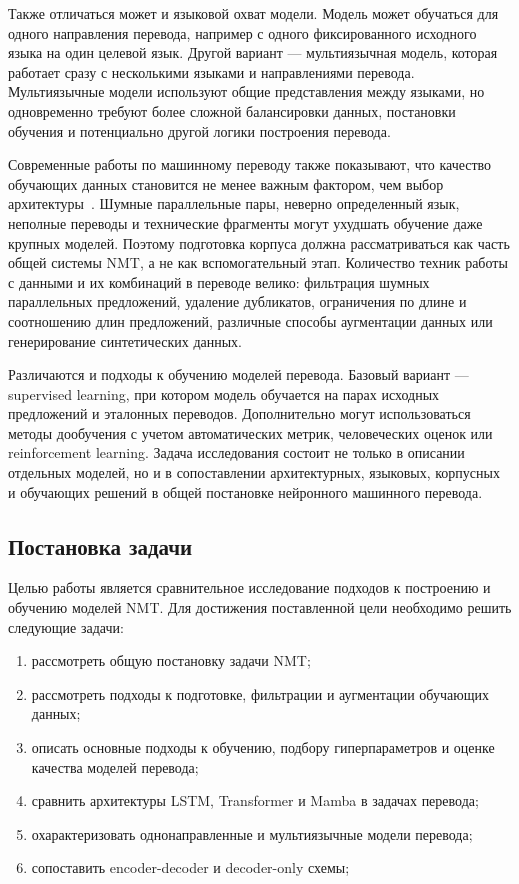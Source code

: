 Также отличаться может и языковой охват модели.
Модель может обучаться для одного направления перевода, например с одного фиксированного исходного языка на один целевой язык.
Другой вариант --- мультиязычная модель, которая работает сразу с несколькими языками и направлениями перевода.
Мультиязычные модели используют общие представления между языками, но одновременно требуют более сложной балансировки данных, постановки обучения и потенциально другой логики построения перевода.

Современные работы по машинному переводу также показывают, что качество обучающих данных становится не менее важным фактором, чем выбор архитектуры~\cite{newspalm_data}.
Шумные параллельные пары, неверно определенный язык, неполные переводы и технические фрагменты могут ухудшать обучение даже крупных моделей.
Поэтому подготовка корпуса должна рассматриваться как часть общей системы NMT, а не как вспомогательный этап.
Количество техник работы с данными и их комбинаций в переводе велико: фильтрация шумных параллельных предложений, удаление дубликатов, ограничения по длине и соотношению длин предложений, различные способы аугментации данных или генерирование синтетических данных.

Различаются и подходы к обучению моделей перевода.
Базовый вариант --- supervised learning, при котором модель обучается на парах исходных предложений и эталонных переводов.
Дополнительно могут использоваться методы дообучения с учетом автоматических метрик, человеческих оценок или reinforcement learning.
Задача исследования состоит не только в описании отдельных моделей, но и в сопоставлении архитектурных, языковых, корпусных и обучающих решений в общей постановке нейронного машинного перевода.

\subsection*{Постановка задачи}
Целью работы является сравнительное исследование подходов к построению и обучению моделей NMT.
Для достижения поставленной цели необходимо решить следующие задачи:
\begin{enumerate}[label=\arabic*)]
	\item рассмотреть общую постановку задачи NMT;
	\item рассмотреть подходы к подготовке, фильтрации и аугментации обучающих данных;
	\item описать основные подходы к обучению, подбору гиперпараметров и оценке качества моделей перевода;
	\item сравнить архитектуры LSTM, Transformer и Mamba в задачах перевода;
	\item охарактеризовать однонаправленные и мультиязычные модели перевода;
	\item сопоставить encoder-decoder и decoder-only схемы;
\end{enumerate}
